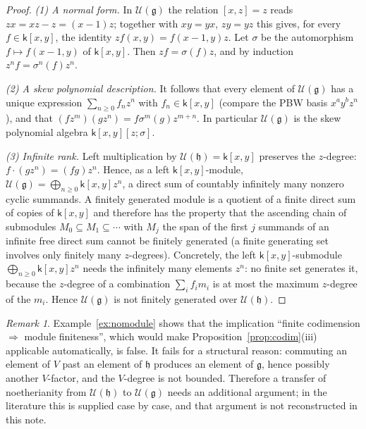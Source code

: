 \documentclass[11pt]{ctexart}
\theoremstyle{plain}
\theoremstyle{definition}
\theoremstyle{remark}
\newtheorem{remark}[theorem]{Remark}
\newcommand{\kk}{\mathsf{k}}
\newcommand{\gl}{\mathfrak{g}}
\newcommand{\hl}{\mathfrak{h}}
\newcommand{\UU}{\mathcal{U}}
\begin{document}
\begin{proof}
\emph{(1) A normal form.} In $\UU(\gl)$ the relation $[x,z]=z$ reads
$zx=xz-z=(x-1)z$; together with $xy=yx$, $zy=yz$ this gives, for every
$f\in\kk[x,y]$, the identity $zf(x,y)=f(x-1,y)z$. Let $\sigma$ be the automorphism
$f\mapsto f(x-1,y)$ of $\kk[x,y]$. Then $zf=\sigma(f)z$, and by induction
$z^nf=\sigma^n(f)z^n$.

\emph{(2) A skew polynomial description.} It follows that every element of
$\UU(\gl)$ has a unique expression $\sum_{n\ge0}f_nz^n$ with $f_n\in\kk[x,y]$ (compare
the PBW basis $x^ay^bz^n$), and that
$(fz^m)(gz^n)=f\sigma^m(g)z^{m+n}$. In particular $\UU(\gl)$ is the skew polynomial
algebra $\kk[x,y][z;\sigma]$.

\emph{(3) Infinite rank.} Left multiplication by $\UU(\hl)=\kk[x,y]$ preserves the
$z$-degree: $f\cdot(gz^n)=(fg)z^n$. Hence, as a left $\kk[x,y]$-module,
$\UU(\gl)=\bigoplus_{n\ge0}\kk[x,y]z^n$, a direct sum of countably infinitely many
nonzero cyclic summands. A finitely generated module is a quotient of a finite direct
sum of copies of $\kk[x,y]$ and therefore has the property that the ascending chain of
submodules $M_0\subseteq M_1\subseteq\cdots$ with $M_j$ the span of the first $j$
summands of an infinite free direct sum cannot be finitely generated (a finite
generating set involves only finitely many $z$-degrees). Concretely, the left
$\kk[x,y]$-submodule $\bigoplus_{n\ge0}\kk[x,y]z^n$ needs the infinitely many
elements $z^n$: no finite set generates it, because the $z$-degree of a combination
$\sum_i f_i m_i$ is at most the maximum $z$-degree of the $m_i$. Hence $\UU(\gl)$ is
not finitely generated over $\UU(\hl)$.
\end{proof}

\begin{remark}\label{rem:codimwhy}
Example~\ref{ex:nomodule} shows that the implication ``finite codimension
$\Rightarrow$ module finiteness'', which would make Proposition~\ref{prop:codim}(iii)
applicable automatically, is false. It fails for a structural reason: commuting an
element of $V$ past an element of $\hl$ produces an element of $\gl$, hence possibly
another $V$-factor, and the $V$-degree is not bounded. Therefore a transfer of
noetherianity from $\UU(\hl)$ to $\UU(\gl)$ needs an additional argument; in the
literature this is supplied case by case, and that argument is not reconstructed in
this note.
\end{remark}
\end{document}
